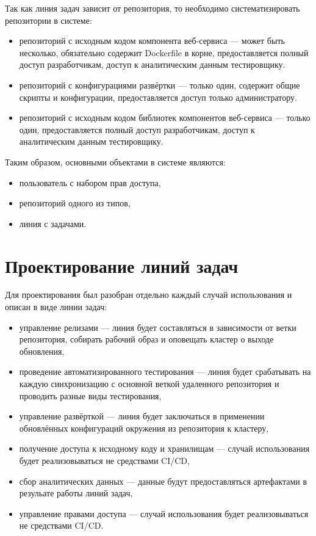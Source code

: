 Так как линия задач зависит от репозитория, то необходимо систематизировать репозитории в системе:

\begin{itemize}
    \item репозиторий с исходным кодом компонента веб-сервиса --- может быть несколько, обязательно содержит Dockerfile в корне,
        предоставляется полный доступ разработчикам, доступ к аналитическим данным тестировщику.
    \item репозиторий с конфигурациями развёртки --- только один, содержит общие скрипты и конфигурации, предоставляется доступ только администратору.
    \item репозиторий с исходным кодом библиотек компонентов веб-сервиса --- только один, предоставляется полный доступ разработчикам,
    доступ к аналитическим данным тестировщику.
\end{itemize}

Таким образом, основными объектами в системе являются:
\begin{itemize}
    \item пользователь с набором прав доступа,
    \item репозиторий одного из типов,
    \item линия с задачами.
\end{itemize}

\section{Проектирование линий задач}

Для проектирования был разобран отдельно каждый случай использования и описан в виде линии задач:
\begin{itemize}
    \item управление релизами --- линия будет составляться в зависимости от ветки репозитория, собирать рабочий образ и оповещать кластер о выходе обновления,
    \item проведение автоматизированного тестирования --- линия будет срабатывать на каждую синхронизацию с основной веткой удаленного репозитория и проводить разные виды тестирования,
    \item управление развёрткой --- линия будет заключаться в применении обновлённых конфигураций окружения из репозитория к кластеру,
    \item получение доступа к исходному коду и хранилищам --- случай использования будет реализовываться не средствами CI/CD,
    \item сбор аналитических данных --- данные будут предоставляться артефактами в резульате работы линий задач,
    \item управление правами доступа --- случай использования будет реализовываться не средствами CI/CD.
\end{itemize}

